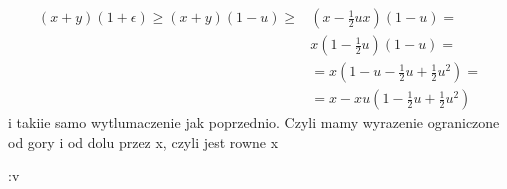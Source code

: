 \documentclass{article}[13pt]
\begin{document}
    \begin{align*}
        (x+y)(1+\epsilon)\geq (x+y)(1-u)\geq &(x-\frac12ux)(1-u)=\\
        &x(1-\frac12u)(1-u)=\\
        &=x(1-u-\frac12u+\frac12u^2)=\\
        &=x-xu(1-\frac12u+\frac12u^2)
    \end{align*}
    i takiie samo wytlumaczenie jak poprzednio. Czyli mamy wyrazenie ograniczone od gory i od dolu przez x, czyli jest rowne x 
    
    :v
\end{document}
